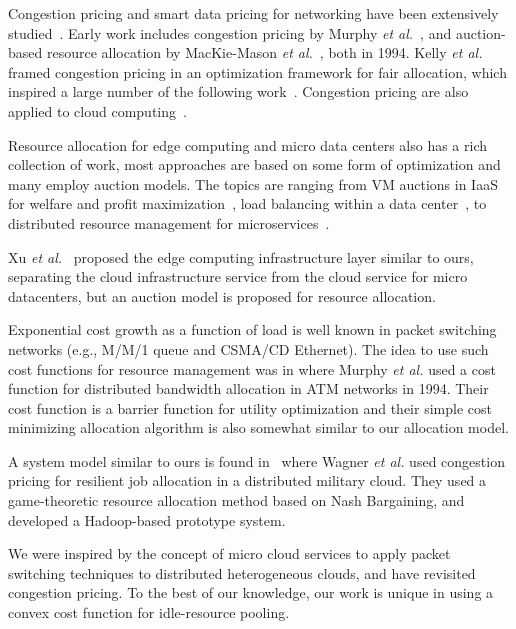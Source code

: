 Congestion pricing and smart data pricing for networking have been
extensively studied~\cite{Sen-2013}.
Early work includes congestion pricing by
Murphy {\em et al.}~\cite{MURPHY19941053},
and auction-based resource allocation by
MacKie-Mason {\em et al.}~\cite{pricing-internet-1994}, both in 1994.
Kelly {\em et al.}~\cite{Kelly-1998} framed congestion pricing in an
optimization framework for fair allocation, which inspired a large
number of the following
work~\cite{Sen-2013,gibbens1999resource,Henderson2001,Briscoe2003-M3I}.
Congestion pricing are also applied to cloud
computing~\cite{Wang-hotcloud2010,Song-2014,Kilcioglu-SIGMETRICS2015,Song-INFOCOM2017}.

Resource allocation for edge computing and micro data centers also has
a rich collection of work, most approaches are based on some form of
optimization and many employ auction models.
The topics are ranging from VM auctions in IaaS for welfare and profit
maximization~\cite{Xu2017-zenith,Zhang2017-VMauction},
load balancing within a data center~\cite{Rikhtegar2021BiTEAD,Chen-SOCC-2014},
to
distributed resource management for microservices~\cite{Suresh-SOA-SOCC2017}.

Xu {\em et al.}~\cite{Xu2017-zenith} proposed the edge computing
infrastructure layer similar to ours, separating the cloud
infrastructure service from the cloud service for micro datacenters,
but an auction model is proposed for resource allocation.

Exponential cost growth as a function of load is well known in packet
switching networks (e.g., M/M/1 queue and CSMA/CD Ethernet).
The idea to use such cost functions for resource management
was in \cite{MURPHY19941053} where
Murphy {\em et al.} used a cost function for distributed bandwidth
allocation in ATM networks in 1994.
Their cost function is a barrier function for utility optimization
and their simple cost minimizing allocation algorithm is also somewhat
similar to our allocation model.

A system model similar to ours is found in~\cite{Wagner-2012} where
Wagner {\em et al.} used congestion pricing for resilient job
allocation in a distributed military cloud.  They used a
game-theoretic resource allocation method based on Nash Bargaining,
and developed a Hadoop-based prototype system.

We were inspired by the concept of micro cloud services to apply packet
switching techniques to distributed heterogeneous clouds, and have
revisited congestion pricing.
To the best of our knowledge, our work is unique in using a convex
cost function for idle-resource pooling.



